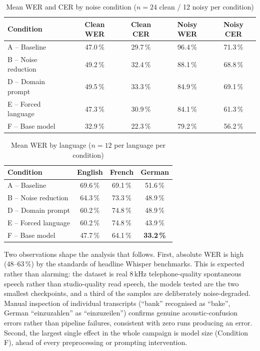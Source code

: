 \documentclass[12pt]{report}
\begin{document}
\begin{table}[H]
\centering
\begin{tabular}{|l|c|c|c|c|}
\hline
\textbf{Condition} & \textbf{Clean WER} & \textbf{Clean CER} & \textbf{Noisy WER} & \textbf{Noisy CER} \\ \hline
A -- Baseline & 47.0\,\% & 29.7\,\% & 96.4\,\% & 71.3\,\% \\ \hline
B -- Noise reduction & 49.2\,\% & 32.4\,\% & 88.1\,\% & 68.8\,\% \\ \hline
D -- Domain prompt & 49.5\,\% & 33.3\,\% & 84.9\,\% & 69.1\,\% \\ \hline
E -- Forced language & 47.3\,\% & 30.9\,\% & 84.1\,\% & 61.3\,\% \\ \hline
F -- Base model & 32.9\,\% & 22.3\,\% & 79.2\,\% & 56.2\,\% \\ \hline
\end{tabular}
\caption{Mean WER and CER by noise condition ($n=24$ clean / 12 noisy per condition)}
\label{tab:results_noise}
\end{table}

\begin{table}[H]
\centering
\begin{tabular}{|l|c|c|c|}
\hline
\textbf{Condition} & \textbf{English} & \textbf{French} & \textbf{German} \\ \hline
A -- Baseline & 69.6\,\% & 69.1\,\% & 51.6\,\% \\ \hline
B -- Noise reduction & 64.3\,\% & 73.3\,\% & 48.9\,\% \\ \hline
D -- Domain prompt & 60.2\,\% & 74.8\,\% & 48.9\,\% \\ \hline
E -- Forced language & 60.2\,\% & 74.8\,\% & 43.9\,\% \\ \hline
F -- Base model & 47.7\,\% & 64.1\,\% & \textbf{33.2\,\%} \\ \hline
\end{tabular}
\caption{Mean WER by language ($n=12$ per language per condition)}
\label{tab:results_lang}
\end{table}

Two observations shape the analysis that follows. First, absolute WER is high (48--63\,\%) by the standards of headline Whisper benchmarks. This is expected rather than alarming: the dataset is real 8\,kHz telephone-quality spontaneous speech rather than studio-quality read speech, the models tested are the two smallest checkpoints, and a third of the samples are deliberately noise-degraded. Manual inspection of individual transcripts (\enquote{bank} recognised as \enquote{bake}, German \enquote{einzuzahlen} as \enquote{einzuzeilen}) confirms genuine acoustic-confusion errors rather than pipeline failures, consistent with zero runs producing an error. Second, the largest single effect in the whole campaign is model size (Condition F), ahead of every preprocessing or prompting intervention.
\end{document}
